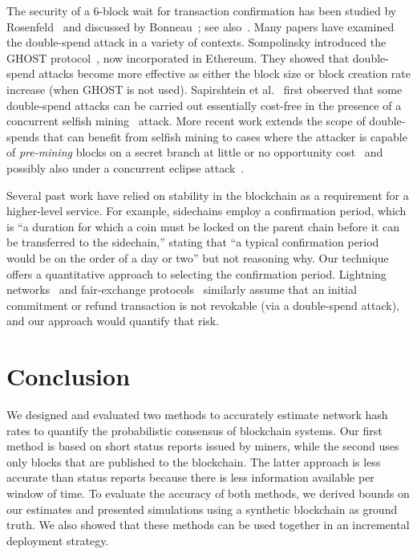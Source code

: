 \documentclass[10pt,sigconf]{acmart}
\newcommand{\1}{{\em (i)}}
\newcommand{\2}{{\em (ii)}}
\newcommand{\3}{{\em (iii)}}
\newcommand{\4}{{\em (iv)}}
\newcommand{\5}{{\em (v)}}
\begin{document}
The security of a 6-block wait for transaction confirmation has been 
studied by Rosenfeld~\cite{Rosenfeld:2012} and discussed by Bonneau~\cite{Bonneau:2015a}; see also~\cite{bitcoin:confirmation}. Many papers have examined the double-spend attack in a variety of contexts. Sompolinsky introduced the GHOST protocol~\cite{Sompolinsky:2015}, now incorporated in Ethereum. They showed that double-spend attacks become more effective as either the block size or block creation rate increase (when GHOST is not used).   Sapirshtein et al.~\cite{Sapirshtein:2015} first observed that some double-spend attacks can be carried out essentially cost-free in the presence of a concurrent selfish mining~\cite{eyal:2014} attack. More recent work extends the scope of double-spends that can benefit from selfish mining to cases where the attacker is capable of \emph{pre-mining} blocks on a secret branch at little or no opportunity cost~\cite{Sompolinsky:2016} and possibly also under a concurrent eclipse attack~\cite{Gervais:2016}. 

Several past work have relied on stability in the blockchain as a requirement for a higher-level service. For example, sidechains\cite{Back:2014} employ a confirmation period, which is ``a duration for which a coin must be locked on the parent chain before it can be transferred to the sidechain,'' stating that ``a typical confirmation period would be on the order of a day or two'' but not reasoning why. Our technique offers a quantitative approach to selecting the confirmation period. Lightning networks~\cite{bitcoin:lightning, Heilman:2017} and fair-exchange protocols~\cite{Barber:2012} similarly assume that an initial commitment or refund  transaction is not revokable (via a double-spend attack), and our approach would quantify that risk.



\section{Conclusion}\label{sec:conc}
We  designed and evaluated two methods to accurately estimate
network hash rates to quantify the probabilistic consensus of blockchain
systems. Our first method is based on short status reports issued by
miners, while the second uses only  blocks that are published to the
blockchain. The latter approach is less accurate than status reports
because there is less information available per window of time. To evaluate the accuracy of
both methods, we derived bounds on our estimates and presented
simulations using a synthetic blockchain as ground truth. We also
showed that these methods can be used together in an incremental deployment strategy.
\end{document}
